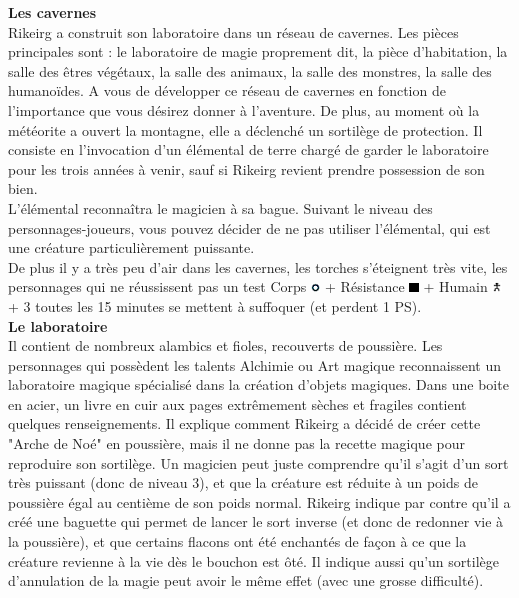 \documentclass[11pt,twoside,a4paper]{article}
\def\imgCORPS{\includegraphics[width=0.25cm]{../../../../../imgGraphics/rolePlayingGame/SimulacreS/mini12x12/corps.png} }
\def\imgRESIS{\includegraphics[width=0.25cm]{../../../../../imgGraphics/rolePlayingGame/SimulacreS/mini12x12/resistance.png} }
\def\imgHUMAI{\includegraphics[width=0.25cm]{../../../../../imgGraphics/rolePlayingGame/SimulacreS/mini12x12/humain.png} }
\begin{document}
\begin{multicols}{3}
{\textbf{Les cavernes}~\\

Rikeirg a construit son laboratoire dans un r{\'e}seau de cavernes. Les pi{\`e}ces principales sont : le laboratoire de magie proprement dit, la pi{\`e}ce d'habitation, la salle des {\^e}tres v{\'e}g{\'e}taux, la salle des animaux, la salle des monstres, la salle des humano{\"i}des. A vous de d{\'e}velopper ce r{\'e}seau de cavernes en fonction de l'importance que vous d{\'e}sirez donner {\`a} l'aventure. De plus, au moment o{\`u} la m{\'e}t{\'e}orite a ouvert la montagne, elle a d{\'e}clench{\'e} un sortil{\`e}ge de protection. Il consiste en l'invocation d'un {\'e}l{\'e}mental de terre charg{\'e} de garder le laboratoire pour les trois ann{\'e}es {\`a} venir, sauf si Rikeirg revient prendre possession de son bien.~\\

L'{\'e}l{\'e}mental reconna{\^i}tra le magicien {\`a} sa bague. Suivant le niveau des personnages-joueurs, vous pouvez d{\'e}cider de ne pas utiliser l'{\'e}l{\'e}mental, qui est une cr{\'e}ature particuli{\`e}rement puissante.~\\

De plus il y a tr{\`e}s peu d'air dans les cavernes, les torches s'{\'e}teignent tr{\`e}s vite, les personnages qui ne r{\'e}ussissent pas un test Corps \imgCORPS + R{\'e}sistance \imgRESIS + Humain \imgHUMAI + 3 toutes les 15 minutes se mettent {\`a} suffoquer (et perdent 1 PS).~\\

\textbf{Le laboratoire}~\\

Il contient de nombreux alambics et fioles, recouverts de poussi{\`e}re. Les personnages qui poss{\`e}dent les talents Alchimie ou Art magique reconnaissent un laboratoire magique sp{\'e}cialis{\'e} dans la cr{\'e}ation d'objets magiques. Dans une boite en acier, un livre en cuir aux pages extr{\^e}mement s{\`e}ches et fragiles contient quelques renseignements. Il explique comment Rikeirg a d{\'e}cid{\'e} de cr{\'e}er cette "Arche de No{\'e}" en poussi{\`e}re, mais il ne donne pas la recette magique pour reproduire son sortil{\`e}ge. Un magicien peut juste comprendre qu'il s'agit d'un sort tr{\`e}s puissant (donc de niveau 3), et que la cr{\'e}ature est r{\'e}duite {\`a} un poids de poussi{\`e}re {\'e}gal au centi{\`e}me de son poids normal. Rikeirg indique par contre qu'il a cr{\'e}{\'e} une baguette qui permet de lancer le sort inverse (et donc de redonner vie {\`a} la poussi{\`e}re), et que certains flacons ont {\'e}t{\'e} enchant{\'e}s de fa\c{c}on {\`a} ce que la cr{\'e}ature revienne {\`a} la vie d{\`e}s le bouchon est {\^o}t{\'e}. Il indique aussi qu'un sortil{\`e}ge d'annulation de la magie peut avoir le m{\^e}me effet (avec une grosse difficult{\'e}).~\\

}
\end{multicols}
\end{document}
